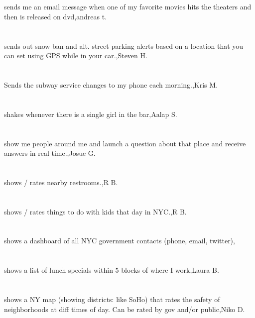 \section{}sends me an email message when one of my favorite movies hits the theaters and then is released on dvd,andreas t.	
\section{}sends out snow ban and alt. street parking alerts based on a location that you can set using GPS while in your car.,Steven H.	
\section{}Sends the subway service changes to my phone each morning.,Kris M.	
\section{}shakes whenever there is a single girl in the bar,Aalap S.
\section{}show me people around me and launch a question about that place and receive answers in real time.,Josue G.
\section{}shows / rates nearby restrooms.,R B.
\section{}shows / rates things to do with kids that day in NYC.,R B.
\section{}shows a dashboard of all NYC government contacts (phone, email, twitter),
\section{}shows a list of lunch specials within 5 blocks of where I work,Laura B.
\section{}shows a NY map (showing districts: like SoHo) that rates the safety of neighborhoods at diff times of day. Can be rated by gov and/or public,Niko D.
